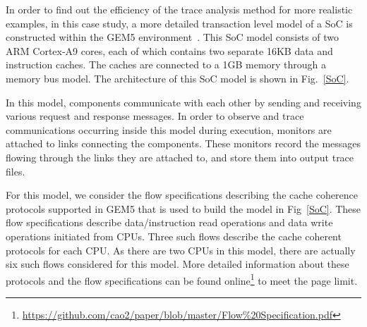 \documentclass[conference]{IEEEtran}
\begin{document}
In order to find out the efficiency of the trace analysis method for more realistic examples, in this case study, a more detailed transaction level model of a SoC is constructed within the GEM5 environment~\cite{Binkert2011}.  This SoC model consists of two ARM Cortex-A9 cores, each of which contains two separate 16KB data and instruction caches.  The caches are connected to a 1GB memory through a memory bus model.  The architecture of this SoC model is shown in Fig.~\ref{SoC}.  

In this model, components communicate with each other by sending and receiving various request and response messages.  In order to observe and trace communications occurring inside this model during execution, monitors are attached to links connecting the components. These monitors record the messages flowing through the links they are attached to, and store them into output trace files.




For this model, we consider the flow specifications describing the cache coherence protocols supported in GEM5 that is used to build the model in Fig~\ref{SoC}.  These flow specifications describe data/instruction read operations and data write operations initiated from CPUs.  Three such flows describe the cache coherent protocols for each CPU.  As there are two CPUs in this model, there are actually six such flows considered for this model.  More detailed information about these protocols and the flow specifications can be found online\footnote{\url{https://github.com/cao2/paper/blob/master/Flow\%20Specification.pdf}} to meet the page limit.
\end{document}
